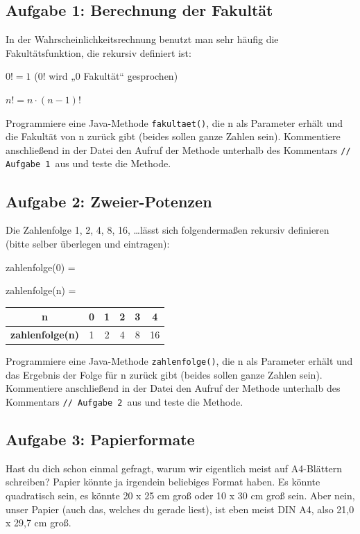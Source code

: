 \subsection{Aufgabe 1: Berechnung der Fakultät}

In der Wahrscheinlichkeitsrechnung benutzt man sehr häufig die Fakultätsfunktion, die rekursiv definiert ist:

$0! = 1$ \hspace{2cm}		(0! wird „0 Fakultät“ gesprochen)

$n! = n \cdot (n-1)!$

Programmiere eine Java-Methode \lstinline|fakultaet()|, die n als Parameter
erhält und die Fakultät von n zurück gibt (beides sollen ganze Zahlen sein).
Kommentiere anschließend in der Datei den Aufruf der Methode unterhalb des
Kommentars \glqq\lstinline|// Aufgabe 1|\grqq\ aus und teste die Methode.


\subsection{Aufgabe 2: Zweier-Potenzen}

Die Zahlenfolge 1, 2, 4, 8, 16, \ldots lässt sich folgendermaßen rekursiv
definieren (bitte selber überlegen und eintragen):

zahlenfolge(0) = 

zahlenfolge(n) =

\begin{tabular}{|c|c|c|c|c|c|}\hline
\textbf{n}              & 0 & 1 & 2 & 3 &  4 \\ \hline
\textbf{zahlenfolge(n)} & 1 & 2 & 4 & 8 & 16 \\ \hline
\end{tabular}

Programmiere eine Java-Methode \lstinline|zahlenfolge()|, die n als Parameter
erhält und das Ergebnis der Folge für n zurück gibt (beides sollen ganze Zahlen sein). 
Kommentiere anschließend in der Datei den Aufruf der Methode unterhalb des
Kommentars \glqq\lstinline|// Aufgabe 2|\grqq\ aus und teste die Methode.


\subsection{Aufgabe 3: Papierformate}

Hast du dich schon einmal gefragt, warum wir eigentlich meist auf A4-Blättern
schreiben? Papier könnte ja irgendein beliebiges Format haben. Es könnte
quadratisch sein, es könnte 20 x 25 cm groß oder 10 x 30 cm groß sein. Aber
nein, unser Papier (auch das, welches du gerade liest), ist eben meist DIN A4,
also 21,0 x 29,7 cm groß.

